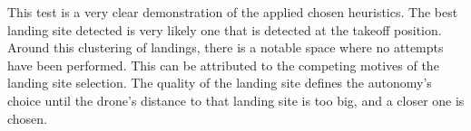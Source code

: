     This test is a very clear demonstration of the applied chosen heuristics. The best landing site detected is very likely one that is detected at the takeoff position. Around this clustering of landings, there is a notable space where no attempts have been performed. This can be attributed to the competing motives of the landing site selection. The quality of the landing site defines the autonomy's choice until the drone's distance to that landing site is too big, and a closer one is chosen. 

